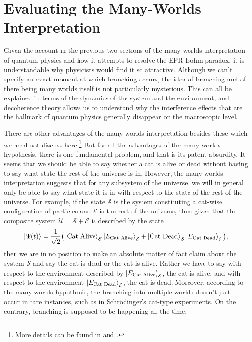  
    
    \section{Evaluating the Many-Worlds Interpretation}\label{manyworldsinterpretation2}
    Given the account in the previous two sections of the many-worlds interpretation of quantum physics and how it attempts to resolve the EPR-Bohm paradox, it is understandable why physicists would find it so attractive. Although we can't specify an exact moment at which branching occurs, the idea of branching and of there being many worlds itself is not particularly mysterious. This can all be explained in terms of the dynamics of the system and the environment, and decoherence theory allows us to understand why the interference effects that are the hallmark of quantum physics generally disappear on the macroscopic level. 
       
       There are other advantages  of the many-worlds interpretation besides these which we need not discuss here.\footnote{More details can be found in \cite{Schlosshauer} and \cite{joos2013decoherence}.} But for all the advantages of the many-worlds hypothesis, there is one fundamental problem, and that is its patent absurdity. It seems that we should be able to say whether a cat is alive or dead without having to say what state the rest of the universe is in. However, the many-worlds interpretation suggests that for any subsystem of the universe, we will in general only be able to say what state it is in with respect to the state of the rest of the universe. For example, if the state $\mathcal{S}$ is the system constituting a cat-wise configuration of particles and $\mathcal{E}$ is the rest of the universe, then given that the composite system $\mathcal{U}=\mathcal{S}+\mathcal{E}$ is described by the state $$\ket{\Psi(t)}=\frac{1}{\sqrt{2}}\big(\ket{\text{Cat Alive}}_\mathcal{S}\ket{E_\text{Cat Alive}}_\mathcal{E}+\ket{\text{Cat Dead}}_\mathcal{S}\ket{E_\text{Cat Dead}}_\mathcal{E}\big),$$ then we are in no position to make an absolute matter of fact claim about the system $\mathcal{S}$ and say the cat is dead or the cat is alive. Rather we have to say with respect to the environment described by $\ket{E_\text{Cat Alive}}_\mathcal{E}$, the cat is alive, and with respect to the environment $\ket{E_\text{Cat Dead}}_\mathcal{E}$, the cat is dead. Moreover, according to the many-worlds hypothesis, the branching into multiple worlds doesn't just occur in rare instances, such as in Schr\"{o}dinger's cat-type experiments. On the contrary, branching is supposed to be happening all the time.  
       
